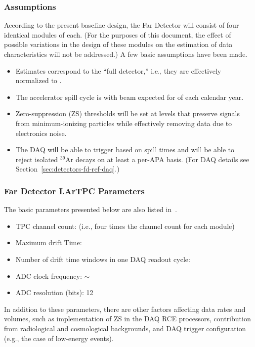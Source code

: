 \subsubsection{Assumptions}
\label{sec:detectors-sc-infrastructure-assumptions}
According to the present baseline design, the Far Detector will
consist of four identical modules of \tpcmodulemass each.  (For the
purposes of %
this document, %
the effect of possible variations in the design of these modules on the 
estimation of data characteristics will not be
addressed.) A few basic assumptions have been made.
\begin{itemize}
\item Estimates correspond to the ``full detector,''
  i.e., they are effectively normalized to \dunedetectormass.
\item The accelerator spill cycle is \beamspillcycle with beam expected
  for \beamrunfraction of each calendar year.
\item Zero-suppression (ZS) thresholds will be set at levels that preserve
  signals from minimum-ionizing particles while effectively removing
  data due to electronics noise.
\item The DAQ will be able to trigger based on spill times and will be
  able to reject isolated $^{39}$Ar decays on at least a per-APA
  basis. (For DAQ details see Section~\ref{sec:detectors-fd-ref-daq}.)
\end{itemize}

\subsubsection{Far Detector LArTPC Parameters}
The basic parameters presented below are also listed in~\cite{cdr-annex-rates}.
\begin{itemize}
\item TPC channel count: \dunenumberchannels (i.e., four times the
  \daqchannelspermodule channel count for each \tpcmodulemass module)
\item Maximum drift Time: \tpcdrifttime
\item Number of drift time windows in one DAQ readout cycle: \daqdriftsperreadout
\item ADC clock frequency: $\sim$\daqsamplerate
\item ADC resolution (bits): 12
\end{itemize}

In addition to these parameters, there are other factors
affecting data rates and volumes, such as implementation of ZS in the DAQ RCE processors,
contribution from radiological and cosmological backgrounds, and DAQ
trigger configuration (e.g., the case of low-energy events). 

